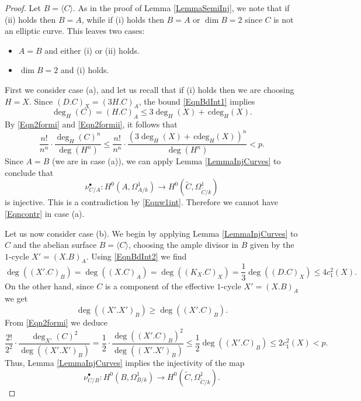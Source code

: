\documentclass[11pt]{amsart}
\theoremstyle{remark}
\numberwithin{equation}{section}
\newcommand{\cdeg}{\,\mathrm{cdeg}}
\begin{document}
\begin{proof}
Let $B=\langle C\rangle$. As in the proof of Lemma \ref{LemmaSemiInj}, we note that if (ii) holds then $B=A$, while if (i) holds then $B=A$ or $\dim B=2$ since $C$ is not an elliptic curve. This leaves two cases: 
\begin{itemize}
\item[(a)] $A=B$ and either (i) or (ii) holds.
\item[(b)] $\dim B=2$ and (i) holds.
\end{itemize}


First we consider case (a), and let us recall that if (i) holds then we are choosing $H=X$. Since $(D.C)_X=(3H.C)_A$, the bound \eqref{EqnBdInt1} implies
$$
\deg_H(C)=(H.C)_A\le 3\deg_H(X) + \cdeg_H(X).
$$
By  \eqref{Eqn2formi} and \eqref{Eqn2formii}, it follows that
$$
\frac{n!}{n^n}\cdot \frac{\deg_H(C)^n}{\deg(H^n)} \le  \frac{n!}{n^n}\cdot \frac{(3\deg_H(X) + \cdeg_H(X))^n}{\deg(H^n)}<p. 
$$
Since $A=B$ (we are in case (a)), we can apply Lemma \ref{LemmaInjCurves}  to conclude that 
$$
\nu_{C/A}^\bullet :H^0(A,\Omega^1_{A/k})\to H^0(\widetilde{C},\Omega^1_{\widetilde{C}/k})
$$
is injective. This is a contradiction by \eqref{Eqnw1int}. Therefore we cannot have \eqref{Eqncontr} in case (a).


Let us now consider case (b). We begin by applying Lemma \ref{LemmaInjCurves} to $C$ and the abelian surface $B=\langle C\rangle$, choosing the ample divisor in $B$ given by the $1$-cycle $X'=(X.B)_A$.  Using \eqref{EqnBdInt2} we find
$$
\deg((X'.C)_B) = \deg((X.C)_A) =\deg((K_X.C)_X)=\frac{1}{3}\deg((D.C)_X)\le 4c_1^2(X).
$$
On the other hand, since $C$ is a component of the effective $1$-cycle $X'=(X.B)_A$ we get
$$
\deg((X'.X')_B) \ge \deg((X'.C)_B).
$$
From  \eqref{Eqn2formi} we deduce
$$
\frac{2!}{2^2}\cdot \frac{\deg_{X'}(C)^2}{\deg((X'.X')_B)}=\frac{1}{2}\cdot\frac{\deg((X'.C)_B)^2}{\deg((X'.X')_B)}\le \frac{1}{2}\deg((X'.C)_B)\le 2c_1^2(X)<p.
$$
Thus, Lemma \ref{LemmaInjCurves} implies the injectivity of the map
\begin{equation}\label{EqnnuCB}
\nu^\bullet_{C/B}:H^0(B,\Omega^1_{B/k})\to H^0(\widetilde{C},\Omega^1_{\widetilde{C}/k}).
\end{equation}



\end{proof}
\end{document}
